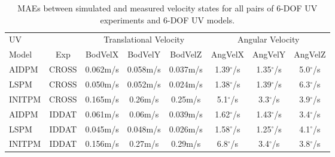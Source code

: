 \begin{table}[htbp]
\ssp
\caption{\acfp{MAE} between simulated and measured velocity states for  
  all pairs of 6-\ac{DOF} \ac{UV} experiments and 6-\ac{DOF} \ac{UV} models.}
\begin{center}
\begin{tabular}{p{1.5cm}|ccccccc}
\ac{UV}  &  & \multicolumn{3}{c}{Translational Velocity} & \multicolumn{3}{c}{Angular Velocity} \\
 Model & Exp  & BodVelX & BodVelY & BodVelZ & AngVelX & AngVelY & AngVelZ \\ \hline
\ac{AIDPM} & \ac{CROSS}  & 0.062m/s & 0.058m/s & 0.037m/s & 1.39$^\circ$/s & 1.35$^\circ$/s & 5.0$^\circ$/s \\
\ac{LSPM} & \ac{CROSS}  & 0.050m/s & 0.052m/s & 0.024m/s & 1.38$^\circ$/s & 1.39$^\circ$/s & 6.3$^\circ$/s \\
\ac{INITPM} & \ac{CROSS}  & 0.165m/s & 0.26m/s & 0.25m/s & 5.1$^\circ$/s & 3.3$^\circ$/s & 3.9$^\circ$/s \\
\ac{AIDPM} & \ac{IDDAT}  & 0.061m/s & 0.06m/s & 0.039m/s & 1.62$^\circ$/s & 1.43$^\circ$/s & 3.4$^\circ$/s \\
\ac{LSPM} & \ac{IDDAT}  & 0.045m/s & 0.048m/s & 0.026m/s & 1.58$^\circ$/s & 1.25$^\circ$/s & 4.1$^\circ$/s \\
\ac{INITPM} & \ac{IDDAT}  & 0.156m/s & 0.27m/s & 0.29m/s & 6.8$^\circ$/s & 3.4$^\circ$/s & 3.8$^\circ$/s \\
\end{tabular}
\end{center}
\label{chUV_AID.tb.SE3_vel_MAE}
\end{table}




